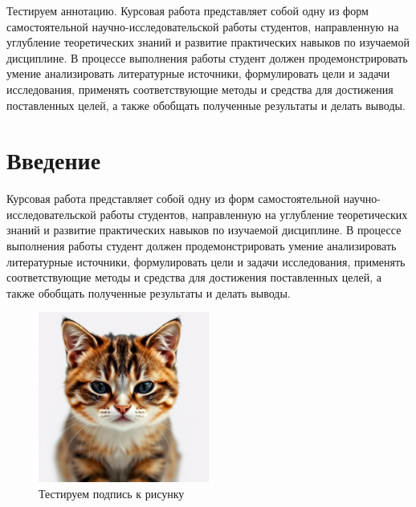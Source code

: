 \documentclass{HSECourseW}
\begin{document}
\titlepage

\begin{abstractpage}
	Тестируем аннотацию. Курсовая работа представляет собой одну из форм самостоятельной научно-исследовательской работы студентов, направленную на углубление теоретических знаний и развитие практических навыков по изучаемой дисциплине. В процессе выполнения работы студент должен продемонстрировать умение анализировать литературные источники, формулировать цели и задачи исследования, применять соответствующие методы и средства для достижения поставленных целей, а также обобщать полученные результаты и делать выводы. 
	
\end{abstractpage}

\tableofcontents

\section{Введение}  

Курсовая работа представляет собой одну из форм самостоятельной научно-исследовательской работы студентов, направленную на углубление теоретических знаний и развитие практических навыков по изучаемой дисциплине. В процессе выполнения работы студент должен продемонстрировать умение анализировать литературные источники, формулировать цели и задачи исследования, применять соответствующие методы и средства для достижения поставленных целей, а также обобщать полученные результаты и делать выводы.  \cite{ispras}

\begin{figure}[htbp]
	\centering %
	\includegraphics[width=0.5\textwidth]{crycattest.png} %
	\caption{Тестируем подпись к рисунку} %
	\label{fig:crycattest} %
\end{figure}
\end{document}
